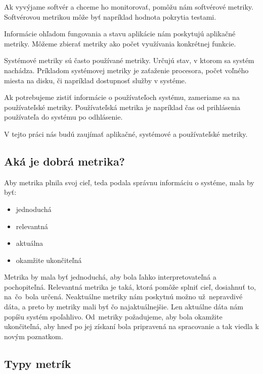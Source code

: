 \documentclass[a4paper, upjsfrontpage, disablespecwarning, thesismargins, thesislinespacing]{rnthesis}
\begin{document}
Ak vyvýjame softvér a chceme ho monitorovať, pomôžu nám softvérové metriky.
Softvérovou metrikou môže byť napríklad hodnota pokrytia testami.

Informácie ohľadom fungovania a stavu aplikácie nám poskytujú aplikačné metriky.
Môžeme zbierať metriky ako počet využívania konkrétnej funkcie.

Systémové metriky sú často používané metriky.
Určujú stav, v ktorom sa systém nachádza.
Príkladom systémovej metriky je zaťaženie procesora, počet voľného miesta na disku, či napríklad dostupnosť služby v systéme.

Ak potrebujeme zistiť informácie o používateľoch systému, zameriame sa na používateľské metriky.
Používateľská metrika je napríklad čas od prihlásenia používateľa do systému po odhlásenie.

V tejto práci nás budú zaujímať aplikačné, systémové a používateľské metriky.

\subsection{Aká je dobrá metrika?}

Aby metrika plnila svoj cieľ, teda podala správnu informáciu o systéme, mala by byť:
\begin{itemize}
	\item jednoduchá
	\item relevantná
	\item aktuálna
	\item okamžite ukončiteľná
\end{itemize}

Metrika by mala byť jednoduchá, aby bola ľahko interpretovateľná a pochopiteľná.
Relevantná metrika je taká, ktorá pomôže splniť cieľ, dosiahnuť to, na~čo~bola určená.
Neaktuálne metriky nám poskytnú možno už~nep\-ravdivé dáta, a preto by metriky mali byť čo najaktuálnejšie. 
Len aktuálne dáta nám popíšu systém spoľahlivo.
Od~metriky požadujeme, aby bola okamžite ukončiteľná, aby hneď po jej získaní bola pripravená na spracovanie a tak viedla k novým poznatkom.
\cite{4}

\subsection{Typy metrík}
\end{document}

